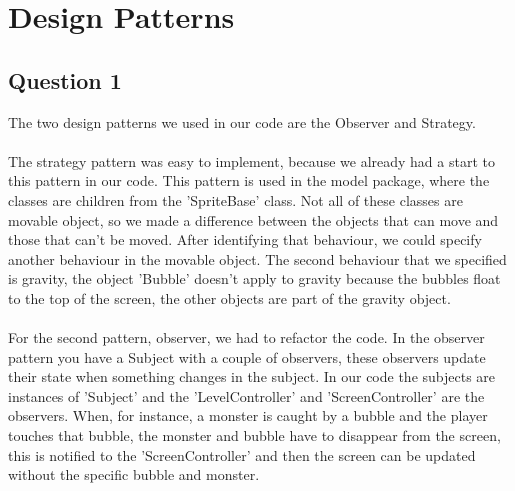 \chapter{Design Patterns}


\section{Question 1}

The two design patterns we used in our code are the Observer and Strategy.\\\\ 
The strategy pattern was easy to implement, because we already had a start to this pattern in our code. This pattern is used in the model package, where the classes are children from the 'SpriteBase' class. Not all of these classes are movable object, so we made a difference between the objects that can move and those that can't be moved. After identifying that behaviour, we could specify another behaviour in the movable object. The second behaviour that we specified is gravity, the object 'Bubble' doesn't apply to gravity because the bubbles float to the top of the screen, the other objects are part of the gravity object.\\\\
For the second pattern, observer, we had to refactor the code. In the observer pattern you have a Subject with a couple of observers, these observers update their state when something changes in the subject. In our code the subjects are instances of 'Subject' and the 'LevelController' and 'ScreenController' are the observers. When, for instance, a monster is caught by a bubble and the player touches that bubble, the monster and bubble have to disappear from the screen, this is notified to the 'ScreenController' and then the screen can be updated without the specific bubble and monster.
